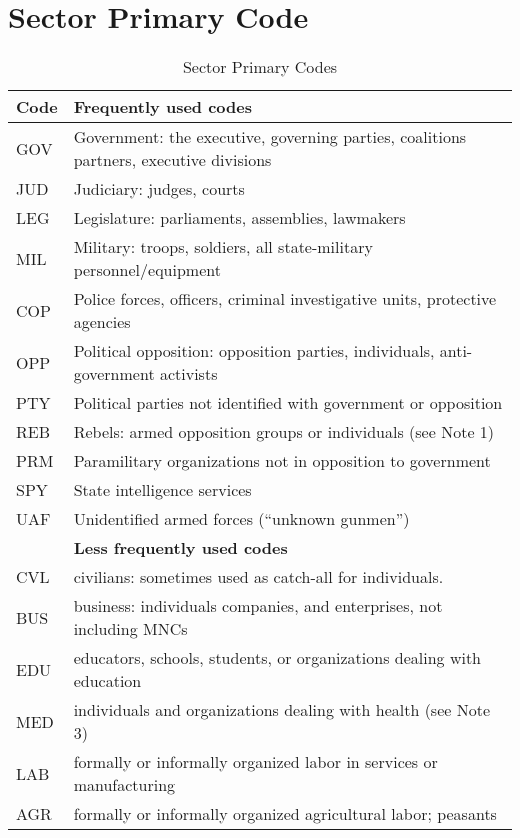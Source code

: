 \documentclass[11pt]{report}
\begin{document}
\newpage 

\section{Sector Primary Code}

\begin{center}
\begin{longtable}{|l|p{13cm}|}
\caption{Sector Primary Codes}
\label{tab:roles}
 \\ \cline{1-2}
  \textbf{Code} & \textbf{Frequently used codes}\\
  \hline
	  GOV & Government: the executive, governing parties, coalitions partners, executive divisions \\ 
	  JUD & Judiciary: judges, courts \\ 
	  LEG & Legislature: parliaments, assemblies, lawmakers \\
	  MIL & Military: troops, soldiers, all state-military personnel/equipment\\ 
	  COP & Police forces, officers, criminal investigative units, protective agencies \\ 
	  OPP & Political opposition: opposition parties, individuals, anti-government activists \\
	  PTY & Political parties not identified with government or opposition \\
	  REB & Rebels: armed opposition groups or individuals (see Note 1)\\ 
	  PRM & Paramilitary organizations not in opposition to government\\ 
	  SPY & State intelligence services \\ 
	  UAF & Unidentified armed forces (``unknown gunmen'') \\ 
  \hline
~   & \textbf{Less frequently used codes}\\
 \hline
	  CVL & civilians: sometimes used as catch-all for individuals.  \\
	  BUS & business: individuals companies, and enterprises, not including MNCs \\  
	  EDU & educators, schools, students, or organizations dealing with education \\ 
	  MED & individuals and organizations dealing with health (see Note 3) \\
	  LAB & formally or informally organized labor in services or manufacturing \\
	  AGR & formally or informally organized agricultural labor; peasants \\

\end{longtable}
\end{center}
\end{document}
